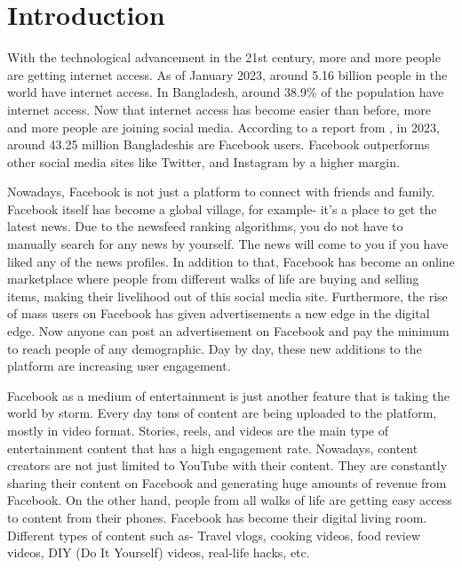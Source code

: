 \chapter{Introduction}\label{intro}

With the technological advancement in the 21st century, more and more people are getting internet access. As of January 2023, around 5.16 billion people in the world have internet access. In Bangladesh, around 38.9\% of the population have internet access. \cite{datareportal2023} Now that internet access has become easier than before, more and more people are joining social media. According to a report from \cite[DataReportal]{datareportal2023}, in 2023, around 43.25 million Bangladeshis are Facebook users. Facebook outperforms other social media sites like Twitter, and Instagram by a higher margin.

Nowadays, Facebook is not just a platform to connect with friends and family. Facebook itself has become a global village, for example- it's a place to get the latest news. Due to the newsfeed ranking algorithms, you do not have to manually search for any news by yourself. The news will come to you if you have liked any of the news profiles. In addition to that, Facebook has become an online marketplace where people from different walks of life are buying and selling items, making their livelihood out of this social media site. Furthermore, the rise of mass users on Facebook has given advertisements a new edge in the digital edge. Now anyone can post an advertisement on Facebook and pay the minimum to reach people of any demographic. Day by day, these new additions to the platform are increasing user engagement.

Facebook as a medium of entertainment is just another feature that is taking the world by storm. Every day tons of content are being uploaded to the platform, mostly in video format. Stories, reels, and videos are the main type of entertainment content that has a high engagement rate. Nowadays, content creators are not just limited to YouTube with their content. They are constantly sharing their content on Facebook and generating huge amounts of revenue from Facebook. On the other hand, people from all walks of life are getting easy access to content from their phones. Facebook has become their digital living room. Different types of content such as- Travel vlogs, cooking videos, food review videos, DIY (Do It Yourself) videos, real-life hacks, etc.




